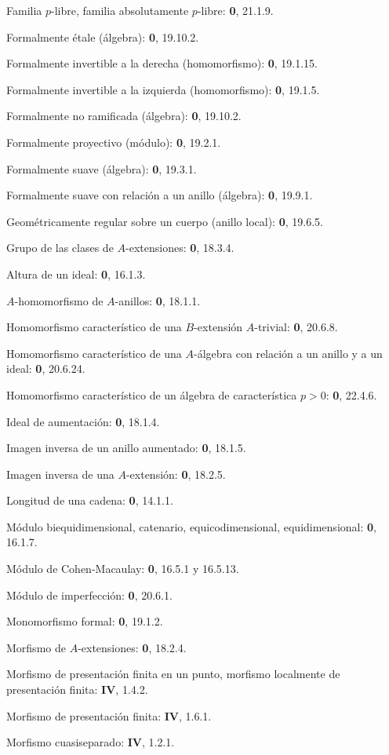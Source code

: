 Familia $p$-libre, familia absolutamente $p$-libre: \textbf{0}, 21.1.9.\par
Formalmente étale (álgebra): \textbf{0}, 19.10.2.\par
Formalmente invertible a la derecha (homomorfismo): \textbf{0}, 19.1.15.\par
Formalmente invertible a la izquierda (homomorfismo): \textbf{0}, 19.1.5.\par
Formalmente no ramificada (álgebra): \textbf{0}, 19.10.2.\par
Formalmente proyectivo (módulo): \textbf{0}, 19.2.1.\par
Formalmente suave (álgebra): \textbf{0}, 19.3.1.\par
Formalmente suave con relación a un anillo (álgebra): \textbf{0}, 19.9.1.\par

Geométricamente regular sobre un cuerpo (anillo local): \textbf{0}, 19.6.5.\par
Grupo de las clases de $A$-extensiones: \textbf{0}, 18.3.4.\par

Altura de un ideal: \textbf{0}, 16.1.3.\par
$A$-homomorfismo de $A$-anillos: \textbf{0}, 18.1.1.\par
Homomorfismo característico de una $B$-extensión $A$-trivial: \textbf{0}, 20.6.8.\par
Homomorfismo característico de una $A$-álgebra con relación a un anillo y a un ideal: \textbf{0}, 20.6.24.\par
Homomorfismo característico de un álgebra de característica $p>0$: \textbf{0}, 22.4.6.\par

Ideal de aumentación: \textbf{0}, 18.1.4.\par
Imagen inversa de un anillo aumentado: \textbf{0}, 18.1.5.\par
Imagen inversa de una $A$-extensión: \textbf{0}, 18.2.5.\par

Longitud de una cadena: \textbf{0}, 14.1.1.\par

Módulo biequidimensional, catenario, equicodimensional, equidimensional: \textbf{0}, 16.1.7.\par
Módulo de Cohen-Macaulay: \textbf{0}, 16.5.1 y 16.5.13.\par
Módulo de imperfección: \textbf{0}, 20.6.1.\par
Monomorfismo formal: \textbf{0}, 19.1.2.\par
Morfismo de $A$-extensiones: \textbf{0}, 18.2.4.\par
Morfismo de presentación finita en un punto, morfismo localmente de presentación finita: \textbf{IV}, 1.4.2.\par
Morfismo de presentación finita: \textbf{IV}, 1.6.1.\par
Morfismo cuasiseparado: \textbf{IV}, 1.2.1.\par

